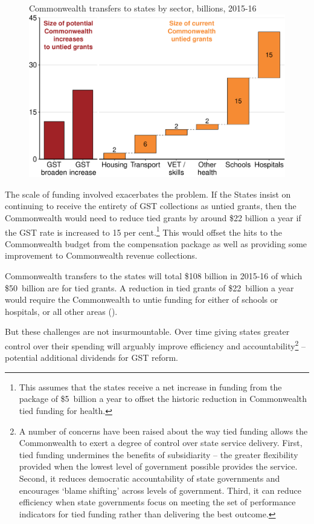 \begin{figure}[!t]
%
{Commonwealth transfers to states by sector, billions, 2015-16}
\includegraphics[width=\columnwidth]{atlas/figure/GST-Figure-10-2.pdf}
\end{figure}

The scale of funding involved exacerbates the problem. If the States insist on continuing to receive the entirety of GST collections as untied grants, then the Commonwealth would need to reduce tied grants by around \$22 billion a year if the GST rate is increased to 15 per cent.\footnote{This assumes that the states receive a net increase in funding from the package of \$5~billion a year to offset the historic reduction in Commonwealth tied funding for health.}   This would offset the hits to the Commonwealth budget from the compensation package as well as providing some improvement to Commonwealth revenue collections.



Commonwealth transfers to the states will total \$108 billion in \mbox{2015-16} of which \$50~billion are for tied grants. A reduction in tied grants of \$22~billion a year would require the Commonwealth to untie funding for either of schools or hospitals, or all other areas (). 



But these challenges are not insurmountable. Over time giving states greater control over their spending will arguably improve efficiency and accountability\footnote{ A number of concerns have been raised about the way tied funding allows the Commonwealth to exert a degree of control over state service delivery. First, tied funding undermines the benefits of subsidiarity – the greater flexibility provided when the lowest level of government possible provides the service. Second, it reduces democratic accountability of state governments and encourages ‘blame shifting’ across levels of government. Third, it can reduce efficiency when state governments focus on meeting the set of performance indicators for tied funding rather than delivering the best outcome.}  – potential additional dividends for GST reform.

